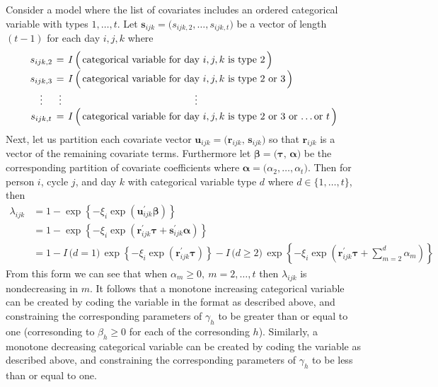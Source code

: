 \documentclass[11pt]{article}
\renewcommand{\vec}{\boldsymbol}
\newcommand{\ind}{I}
\begin{document}
Consider a model where the list of covariates includes an ordered categorical variable with types $1,\dots,t$.  Let $\vec{s}_{ijk} = \big( s_{ijk,2}, \dots, s_{ijk,t} \big)$ be a vector of length $(t-1)$ for each day $i,j,k$ where
\[ \arraycolsep=2pt \begin{array}{ccl}
s_{ijk,2} & = & I\,\Big(\, \text{categorical variable for day $i,j,k$ is type 2} \,\Big) \\[1ex]
s_{ijk,3} & = & I\,\Big(\, \text{categorical variable for day $i,j,k$ is type 2 or 3} \,\Big) \\[1ex]
\vdots & \vdots & \hspace{45mm} \vdots \\
s_{ijk,t} & = & I\,\Big(\, \text{categorical variable for day $i,j,k$ is type 2 or 3 or \dots or $t$} \,\Big)
\end{array} \]
Next, let us partition each covariate vector $\vec{u}_{ijk} = \big(\vec{r}_{ijk},\,  \vec{s}_{ijk}\big)$ so that $\vec{r}_{ijk}$ is a vector of the remaining covariate terms.  Furthermore let $\vec{\beta} = \big( \vec{\tau},\, \vec{\alpha} \big)$ be the corresponding partition of covariate coefficients where $\vec{\alpha} = \big(\alpha_2,\dots,\alpha_t\big)$.  Then for person $i$, cycle $j$, and day $k$ with categorical variable type $d$ where $d \in \{1,\dots,t\}$, then
\begin{align*}
\lambda_{ijk} &= 1 - \exp\left\{ -\xi_i \exp\left( \vec{u}_{ijk}^\prime \vec{\beta} \right) \right\} \\[1ex]
&= 1 - \exp\left\{ -\xi_i \exp\left( \vec{r}_{ijk}^\prime \vec{\tau} + \vec{s}_{ijk}^\prime \vec{\alpha} \right) \right\} \\
&= 1 - \ind\,\big( d = 1 \big)\, \exp\left\{ -\xi_i \exp\left( \vec{r}_{ijk}^\prime \vec{\tau} \right) \right\} - \ind\,\big( d \geq 2 \big)\, \exp\left\{ -\xi_i \exp\left( \vec{r}_{ijk}^\prime \vec{\tau} + \sum_{m=2}^d \alpha_m \right) \right\}
\end{align*}
From this form we can see that when $\alpha_m \geq 0,~ m=2,\dots,t$ then $\lambda_{ijk}$ is nondecreasing in $m$.  It follows that a monotone increasing categorical variable can be created by coding the variable in the format as described above, and constraining the corresponding parameters of $\gamma_h$ to be greater than or equal to one (corresonding to $\beta_h \geq 0$ for each of the corresonding $h$).  Similarly, a monotone decreasing categorical variable can be created by coding the variable as described above, and constraining the corresponding parameters of $\gamma_h$ to be less than or equal to one.
\end{document}
